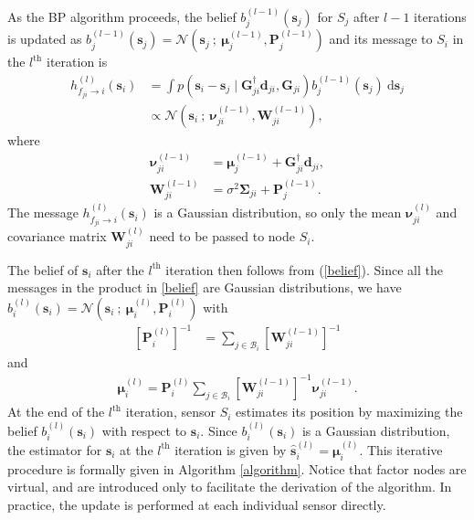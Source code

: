 \documentclass[10pt, twocolumn, final]{IEEEtran}
\newcommand{\bW}{\mathbf{W}}
\newcommand{\bSigma}{\mathbf{\Sigma}}
\newcommand{\N}[2]{{\mathcal{N}\left(#1\ ;\ #2\right)}}
\newcommand{\tc}[1]{^{(#1)}}
\begin{document}
As the BP algorithm proceeds, the belief $b_j^{(l-1)}(\mathbf{s}_j)$ for $S_j$ after $l-1$ iterations is updated as $b_j^{(l-1)}(\mathbf{s}_j) = \N{\mathbf{s}_j}{\bm{\mu}_j^{(l-1)}, \mathbf{P}_j^{(l-1)}}$ and its message to $S_i$ in the $l^{\mathrm{th}}$ iteration is
\begin{align*}
h_{f_{ji} \rightarrow i}^{(l)}(\mathbf{s}_i) & = \int p(\mathbf{s}_i - \mathbf{s}_j \mid \mathbf{G}_{ji}^{\dagger}\mathbf{d}_{ji}, \mathbf{G}_{ji}) b_j^{(l-1)}(\mathbf{s}_j) \ \mathrm{d} \mathbf{s}_j \\
& \propto \N{\mathbf{s}_i}{\bm{\nu}_{ji}^{(l-1)}, \bW\tc{l-1}_{ji}},
\end{align*}
where
\begin{align}
\bm{\nu}_{ji}^{(l-1)}
& = \bm{\mu}_j^{(l-1)} + \mathbf{G}_{ji}^{\dagger}\mathbf{d}_{ji},\label{invmu} \\
\bW\tc{l-1}_{ji}
& = \sigma^2 \bSigma_{ji} + \mathbf{P}_j^{(l-1)}. \label{inv}
\end{align}
The message $h_{f_{ji} \rightarrow i}^{(l)}(\mathbf{s}_i)$ is a Gaussian distribution, so only the mean $\bm{\nu}_{ji}^{(l)}$ and covariance matrix $\bW\tc{l}_{ji}$ need to be passed to node $S_i$.

The belief of $\mathbf{s}_i$ after the $l^{\mathrm{th}}$ iteration then follows from (\ref{belief}). Since all the messages in the product in \eqref{belief} are Gaussian distributions, we have $b_i^{(l)}(\bm{s}_i) = \N{\bm{s}_i}{\bm{\mu}_i^{(l)}, \mathbf{P}_i^{(l)}}$ with
\begin{align}
\left[\mathbf{P}_i^{(l)}\right]^{-1} & = \sum_{j \in \mathcal{B}_i} \left[\bW\tc{l-1}_{ji}\right]^{-1} \label{P}
\end{align}
and
\begin{align}
\bm{\mu}_i^{(l)} = \mathbf{P}_i^{(l)} \sum_{j \in \mathcal{B}_i} \left[\bW\tc{l-1}_{ji}\right]^{-1} \bm{\nu}_{ji}^{(l-1)}. \label{mu}
\end{align}
At the end of the $l^{\mathrm{th}}$ iteration, sensor $S_i$ estimates its position by maximizing the belief $b^{(l)}_i(\mathbf{s}_i)$ with respect to $\mathbf{s}_i$. Since $b^{(l)}_i(\mathbf{s}_i)$ is a Gaussian distribution, the estimator for $\mathbf{s}_i$ at the $l^{\mathrm{th}}$ iteration is given by $\hat{\mathbf{s}}^{(l)}_i = \bm{\mu}^{(l)}_i$. This iterative procedure is formally given in Algorithm \ref{algorithm}. Notice that factor nodes are virtual, and are introduced only to facilitate the derivation of the algorithm. In practice, the update is performed at each individual sensor directly.
\end{document}
